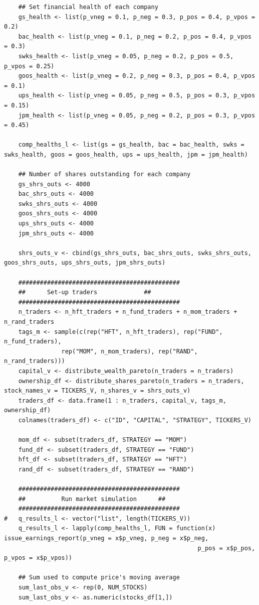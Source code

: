 \documentclass[12pt]{article}
\begin{document}
\begin{lstlisting}
	## Set financial health of each company
	gs_health <- list(p_vneg = 0.1, p_neg = 0.3, p_pos = 0.4, p_vpos = 0.2)
	bac_health <- list(p_vneg = 0.1, p_neg = 0.2, p_pos = 0.4, p_vpos = 0.3)	
	swks_health <- list(p_vneg = 0.05, p_neg = 0.2, p_pos = 0.5, p_vpos = 0.25)
	goos_health <- list(p_vneg = 0.2, p_neg = 0.3, p_pos = 0.4, p_vpos = 0.1)
	ups_health <- list(p_vneg = 0.05, p_neg = 0.5, p_pos = 0.3, p_vpos = 0.15) 
	jpm_health <- list(p_vneg = 0.05, p_neg = 0.2, p_pos = 0.3, p_vpos = 0.45)

	comp_healths_l <- list(gs = gs_health, bac = bac_health, swks = swks_health, goos = goos_health, ups = ups_health, jpm = jpm_health)	
	
	## Number of shares outstanding for each company
	gs_shrs_outs <- 4000 
	bac_shrs_outs <- 4000 
	swks_shrs_outs <- 4000 
	goos_shrs_outs <- 4000 
	ups_shrs_outs <- 4000 
	jpm_shrs_outs <- 4000 
	
	shrs_outs_v <- cbind(gs_shrs_outs, bac_shrs_outs, swks_shrs_outs, goos_shrs_outs, ups_shrs_outs, jpm_shrs_outs)

	#############################################
	## 		Set-up traders             ##
	#############################################
	n_traders <- n_hft_traders + n_fund_traders + n_mom_traders + n_rand_traders
	tags_m <- sample(c(rep("HFT", n_hft_traders), rep("FUND", n_fund_traders),
		        rep("MOM", n_mom_traders), rep("RAND", n_rand_traders)))
	capital_v <- distribute_wealth_pareto(n_traders = n_traders) 
	ownership_df <- distribute_shares_pareto(n_traders = n_traders, stock_names_v = TICKERS_V, n_shares_v = shrs_outs_v)
	traders_df <- data.frame(1 : n_traders, capital_v, tags_m, ownership_df)  
	colnames(traders_df) <- c("ID", "CAPITAL", "STRATEGY", TICKERS_V)
	
	mom_df <- subset(traders_df, STRATEGY == "MOM")
	fund_df <- subset(traders_df, STRATEGY == "FUND")
	hft_df <- subset(traders_df, STRATEGY == "HFT")
	rand_df <- subset(traders_df, STRATEGY == "RAND") 
	
	#############################################
	##          Run market simulation	   ##
	#############################################
#	q_results_l <- vector("list", length(TICKERS_V))
	q_results_l <- lapply(comp_healths_l, FUN = function(x) issue_earnings_report(p_vneg = x$p_vneg, p_neg = x$p_neg, 
												      p_pos = x$p_pos, p_vpos = x$p_vpos))

	## Sum used to compute price's moving average
	sum_last_obs_v <- rep(0, NUM_STOCKS)
	sum_last_obs_v <- as.numeric(stocks_df[1,])
	

\end{lstlisting}
\end{document}
